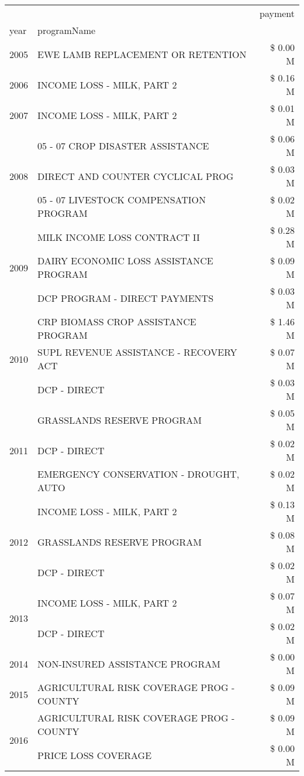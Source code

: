 \begin{tabular}{llr}
\toprule
 &  & payment \\
year & programName &  \\
\midrule
2005 & EWE LAMB REPLACEMENT OR RETENTION & \$ 0.00 M \\
\cline{1-3}
2006 & INCOME LOSS - MILK, PART 2 & \$ 0.16 M \\
\cline{1-3}
2007 & INCOME LOSS - MILK, PART 2 & \$ 0.01 M \\
\cline{1-3}
\multirow[t]{3}{*}{2008} & 05 - 07 CROP DISASTER ASSISTANCE & \$ 0.06 M \\
 & DIRECT AND COUNTER CYCLICAL PROG & \$ 0.03 M \\
 & 05 - 07 LIVESTOCK COMPENSATION PROGRAM & \$ 0.02 M \\
\cline{1-3}
\multirow[t]{3}{*}{2009} & MILK INCOME LOSS CONTRACT II & \$ 0.28 M \\
 & DAIRY ECONOMIC LOSS ASSISTANCE PROGRAM & \$ 0.09 M \\
 & DCP PROGRAM - DIRECT PAYMENTS & \$ 0.03 M \\
\cline{1-3}
\multirow[t]{3}{*}{2010} & CRP BIOMASS CROP ASSISTANCE PROGRAM & \$ 1.46 M \\
 & SUPL REVENUE ASSISTANCE - RECOVERY ACT & \$ 0.07 M \\
 & DCP - DIRECT & \$ 0.03 M \\
\cline{1-3}
\multirow[t]{3}{*}{2011} & GRASSLANDS RESERVE PROGRAM & \$ 0.05 M \\
 & DCP - DIRECT & \$ 0.02 M \\
 & EMERGENCY CONSERVATION - DROUGHT, AUTO & \$ 0.02 M \\
\cline{1-3}
\multirow[t]{3}{*}{2012} & INCOME LOSS - MILK, PART 2 & \$ 0.13 M \\
 & GRASSLANDS RESERVE PROGRAM & \$ 0.08 M \\
 & DCP - DIRECT & \$ 0.02 M \\
\cline{1-3}
\multirow[t]{2}{*}{2013} & INCOME LOSS - MILK, PART 2 & \$ 0.07 M \\
 & DCP - DIRECT & \$ 0.02 M \\
\cline{1-3}
2014 & NON-INSURED ASSISTANCE PROGRAM & \$ 0.00 M \\
\cline{1-3}
2015 & AGRICULTURAL RISK COVERAGE PROG - COUNTY & \$ 0.09 M \\
\cline{1-3}
\multirow[t]{3}{*}{2016} & AGRICULTURAL RISK COVERAGE PROG - COUNTY & \$ 0.09 M \\
 & PRICE LOSS COVERAGE & \$ 0.00 M \\

\end{tabular}
